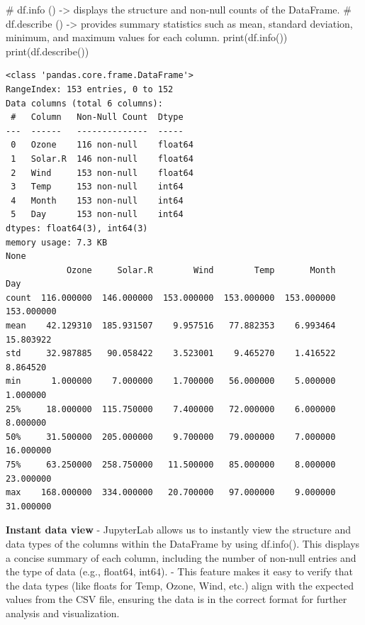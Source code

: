 \documentclass[
  letterpaper,
  DIV=11,
  numbers=noendperiod]{scrreprt}
\newenvironment{Shaded}{\begin{snugshade}}{\end{snugshade}}
\newcommand{\BuiltInTok}[1]{\textcolor[rgb]{0.00,0.23,0.31}{#1}}
\newcommand{\CommentTok}[1]{\textcolor[rgb]{0.37,0.37,0.37}{#1}}
\newcommand{\NormalTok}[1]{\textcolor[rgb]{0.00,0.23,0.31}{#1}}
\begin{document}
\begin{Shaded}
\begin{Highlighting}[]
\CommentTok{\# df.info () {-}\textgreater{} displays the structure and non{-}null counts of the DataFrame.}
\CommentTok{\# df.describe () {-}\textgreater{} provides summary statistics such as mean, standard deviation, minimum, and maximum values for each column.}
\BuiltInTok{print}\NormalTok{(df.info())}
\BuiltInTok{print}\NormalTok{(df.describe())}
\end{Highlighting}
\end{Shaded}

\begin{verbatim}
<class 'pandas.core.frame.DataFrame'>
RangeIndex: 153 entries, 0 to 152
Data columns (total 6 columns):
 #   Column   Non-Null Count  Dtype  
---  ------   --------------  -----  
 0   Ozone    116 non-null    float64
 1   Solar.R  146 non-null    float64
 2   Wind     153 non-null    float64
 3   Temp     153 non-null    int64  
 4   Month    153 non-null    int64  
 5   Day      153 non-null    int64  
dtypes: float64(3), int64(3)
memory usage: 7.3 KB
None
            Ozone     Solar.R        Wind        Temp       Month         Day
count  116.000000  146.000000  153.000000  153.000000  153.000000  153.000000
mean    42.129310  185.931507    9.957516   77.882353    6.993464   15.803922
std     32.987885   90.058422    3.523001    9.465270    1.416522    8.864520
min      1.000000    7.000000    1.700000   56.000000    5.000000    1.000000
25%     18.000000  115.750000    7.400000   72.000000    6.000000    8.000000
50%     31.500000  205.000000    9.700000   79.000000    7.000000   16.000000
75%     63.250000  258.750000   11.500000   85.000000    8.000000   23.000000
max    168.000000  334.000000   20.700000   97.000000    9.000000   31.000000
\end{verbatim}

\textbf{Instant data view} - JupyterLab allows us to instantly view the
structure and data types of the columns within the DataFrame by using
df.info(). This displays a concise summary of each column, including the
number of non-null entries and the type of data (e.g., float64, int64).
- This feature makes it easy to verify that the data types (like floats
for Temp, Ozone, Wind, etc.) align with the expected values from the CSV
file, ensuring the data is in the correct format for further analysis
and visualization.
\end{document}
